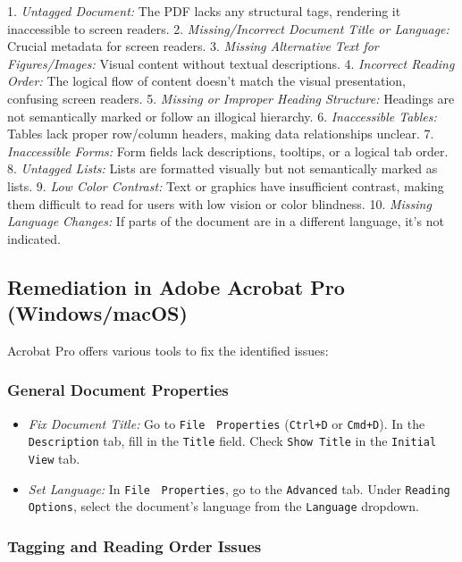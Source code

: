 1.  \emph{Untagged Document:} The PDF lacks any structural tags, rendering it inaccessible to screen readers.\cite{EquidoxBlog}
2.  \emph{Missing/Incorrect Document Title or Language:} Crucial metadata for screen readers.
3.  \emph{Missing Alternative Text for Figures/Images:} Visual content without textual descriptions.
4.  \emph{Incorrect Reading Order:} The logical flow of content doesn't match the visual presentation, confusing screen readers.
5.  \emph{Missing or Improper Heading Structure:} Headings are not semantically marked or follow an illogical hierarchy.
6.  \emph{Inaccessible Tables:} Tables lack proper row/column headers, making data relationships unclear.
7.  \emph{Inaccessible Forms:} Form fields lack descriptions, tooltips, or a logical tab order.
8.  \emph{Untagged Lists:} Lists are formatted visually but not semantically marked as lists.
9.  \emph{Low Color Contrast:} Text or graphics have insufficient contrast, making them difficult to read for users with low vision or color blindness.
10. \emph{Missing Language Changes:} If parts of the document are in a different language, it's not indicated.

\subsection{Remediation in Adobe Acrobat Pro (Windows/macOS)}
\label{subsec:remediation-acrobat}
Acrobat Pro offers various tools to fix the identified issues:
\subsubsection{General Document Properties}
\label{subsubsec:doc-properties}

\begin{itemize}
\item \emph{Fix Document Title:} Go to \texttt{File} $\>$ \texttt{Properties} (\texttt{Ctrl+D} or \texttt{Cmd+D}). In the \texttt{Description} tab, fill in the \texttt{Title} field. Check \texttt{Show Title} in the \texttt{Initial View} tab.
\item \emph{Set Language:} In \texttt{File} $\>$ \texttt{Properties}, go to the \texttt{Advanced} tab. Under \texttt{Reading Options}, select the document's language from the \texttt{Language} dropdown.
\end{itemize}

\subsubsection{Tagging and Reading Order Issues}
\label{subsubsec:tagging-reading-order}

